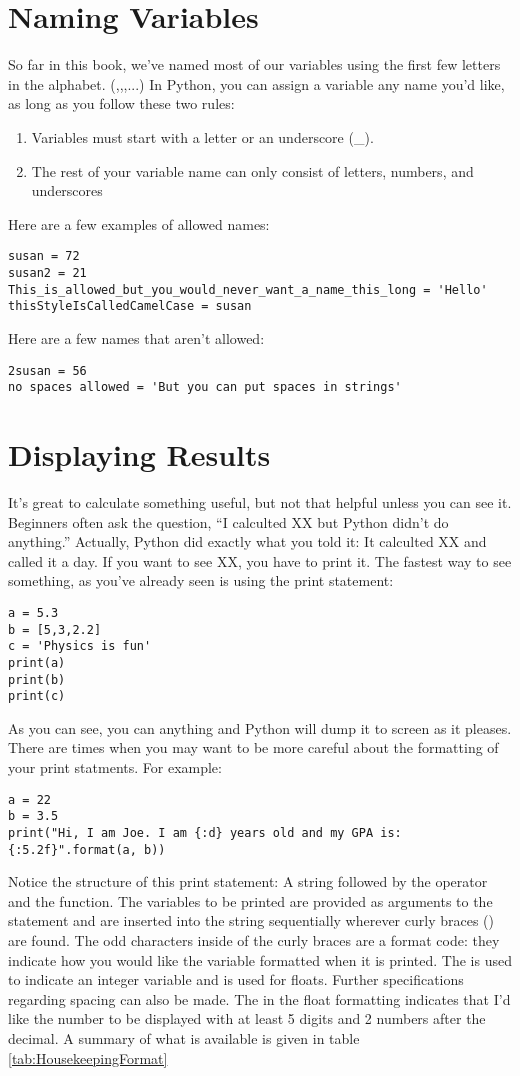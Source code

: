 \section{Naming Variables}
So far in this book, we've named most of our variables using the first
few letters in the alphabet. (,,,...) In Python, you can assign a
variable any name you'd like, as long as you follow these two rules:
\begin{enumerate}
\item Variables must start with a letter or an underscore (\_).
\item The rest of your variable name can only consist of letters,
numbers, and underscores
\end{enumerate}
Here are a few examples of allowed names:
\begin{Verbatim}
susan = 72
susan2 = 21
This_is_allowed_but_you_would_never_want_a_name_this_long = 'Hello'
thisStyleIsCalledCamelCase = susan
\end{Verbatim}
Here are a few names that aren't allowed:
\begin{Verbatim}
2susan = 56
no spaces allowed = 'But you can put spaces in strings'
\end{Verbatim}


\section{Displaying Results}
It's great to calculate something useful, but not that helpful unless
you can see it.  Beginners often ask the question, ``I calculted XX
but Python didn't do anything.''  Actually, Python did exactly what
you told it:  It calculted XX and called it a day.  If you want to see
XX, you have to print it.   The fastest way to see something, as
you've already seen is using the print statement:
\begin{Verbatim}
a = 5.3
b = [5,3,2.2]
c = 'Physics is fun'
print(a)
print(b)
print(c)
\end{Verbatim}
As you can see, you can  anything and Python will dump
it to screen as it pleases.  There are times when you may want to be
more careful about the formatting of your print statments.  For
example:
\begin{Verbatim}
a = 22
b = 3.5
print("Hi, I am Joe. I am {:d} years old and my GPA is:
{:5.2f}".format(a, b))
\end{Verbatim}
Notice the structure of this print statement: A string followed by the
 operator and the  function. The variables to
be printed are provided as arguments to the  statement
and are inserted into the string sequentially wherever curly braces
(\code{\{\}}) are found.  The odd characters inside of the curly
braces are a format code: they indicate how you would like the
variable formatted when it is printed. The  is used to
indicate an integer variable and  is used for floats.
Further specifications regarding spacing can also be made.  The
 in the float formatting indicates that I'd like the number
to be displayed with at least 5 digits and 2 numbers after the
decimal.  A summary of what is available is given in table
\ref{tab:HousekeepingFormat}

